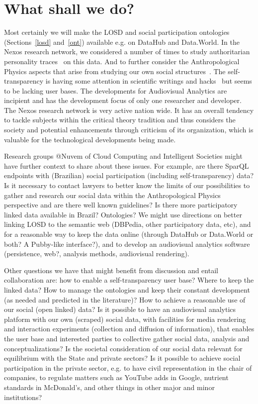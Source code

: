 \documentclass[letterpaper,10pt]{article}
\begin{document}
\section{What shall we do?}
Most certainly we will
make the LOSD and social participation ontologies (Sections~\ref{losd} and~\ref{ont})
available e.g. on DataHub and Data.World.
In the Nexos research network, we
considered a number of times to study authoritarian personality traces~\cite{au}
on this data.
And to further consider the Anthropological Physics aspects that
arise from studying our own social structures~\cite{an,an2}.
The self-transparency is having some attention in scientific writings
and hacks~\cite{aa,aa2} but seems to be lacking user bases.
The developments for Audiovisual Analytics are incipient
and has the development focus of only one researcher and developer.
The Nexos research network is very active nation wide.
It has an overall tendency to tackle subjects within the
critical theory tradition and thus considers the society
and potential enhancements through criticism of its organization,
which is valuable for the technological developments being made.

Research groups @Nuvem of Cloud Computing and Intelligent Societies might have 
further context to share about these issues.
For example, are there SparQL endpoints with (Brazilian) social participation
(including self-transparency) data?
Is it necessary to contact lawyers to
better know the limits of our possibilities
to gather and research our social data within
the Anthropological Physics perspective
and are there well known guidelines?
Is there more participatory linked data available
in Brazil? Ontologies?
We might use directions 
on better linking LOSD to the semantic web
(DBPedia, other participatory data, etc),
and for a reasonable way to keep the data online
(through DataHub or Data.World or both?
A Pubby-like interface?),
and to develop an audiovisual analytics
software
(persistence, web?, analysis methods, audiovisual rendering).

Other questions we have that might benefit from discussion and entail collaboration are:
how to enable a self-transparency user base?
Where to keep the linked data?
How to manage the ontologies and keep their
constant development (as needed and predicted in the literature)?
How to achieve a reasonable 
use of our social (open linked) data?
Is it possible to have an audiovisual analytics
platform with our own (scraped) social data,
with facilities for media rendering and
interaction experiments (collection and diffusion of information),
that enables the user base and interested parties to
collective gather social data, analysis and conceptualizations?
Is the societal consideration of our social data
relevant for equilibrium with the State and private sectors?
Is it possible to achieve social participation in the private sector,
e.g. to have civil representation in the chair of companies,
to regulate matters such as YouTube adds in Google,
nutrient standards in McDonald's,
and other things in other major and minor institutions?
\end{document}
